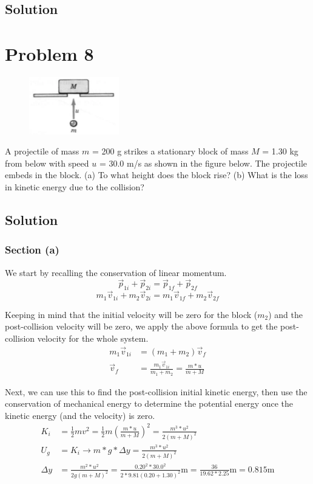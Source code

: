 \documentclass[12pt]{article}
\begin{document}
\subsection*{Solution}


\pagebreak
\section*{Problem 8}
\begin{figure}
    \vspace{-30pt}
    \includegraphics[width=0.35\textwidth]{graph_8.png} 
\end{figure}
A projectile of mass $m$ = 200 g strikes a stationary block of mass $M$ = 1.30 kg from below with speed $u$ = 30.0 m/s as shown in the figure below. The projectile embeds in the block. (a) To what height does the block rise? (b) What is the loss in kinetic energy due to the collision?

\subsection*{Solution}
\subsubsection*{Section (a)}
We start by recalling the conservation of linear momentum.
\[ \vec{p}_{1i} + \vec{p}_{2i} = \vec{p}_{1f} + \vec{p}_{2f} \]
\[ m_1\vec{v}_{1i} + m_2\vec{v}_{2i} = m_1\vec{v}_{1f} + m_2\vec{v}_{2f} \]

Keeping in mind that the initial velocity will be zero for the block ($m_2$) and the post-collision velocity will be zero, we apply the above formula to get the post-collision velocity for the whole system.
\begin{align*}
    m_1\vec{v}_{1i} &=  (m_1 + m_2)\vec{v}_{f}\\
    \vec{v}_{f} &=  \frac{m_1\vec{v}_{1i}}{m_1 + m_2} = \frac{m*u}{m+M}
\end{align*}

Next, we can use this to find the post-collision initial kinetic energy, then use the conservation of mechanical energy to determine the potential energy once the kinetic energy (and the velocity) is zero.
\begin{align*}
    K_i &=  \frac{1}{2}mv^2
        =   \frac{1}{2}m\left(\frac{m*u}{m+M}\right)^2
        =   \frac{m^3*u^2}{2(m+M)^2}\\
    U_g &=  K_i\rightarrow
    m*g*\Delta y    =  \frac{m^3*u^2}{2(m+M)^2}\\
    \Delta y    &=  \frac{m^2*u^2}{2g(m+M)^2}
        =   \frac{0.20^2*30.0^2}{2*9.81(0.20+1.30)^2}\unit{\meter}
        =   \frac{36}{19.62*2.25}\unit{\meter}
        =   \boxed{0.815\unit{\meter}}
\end{align*}
\end{document}
